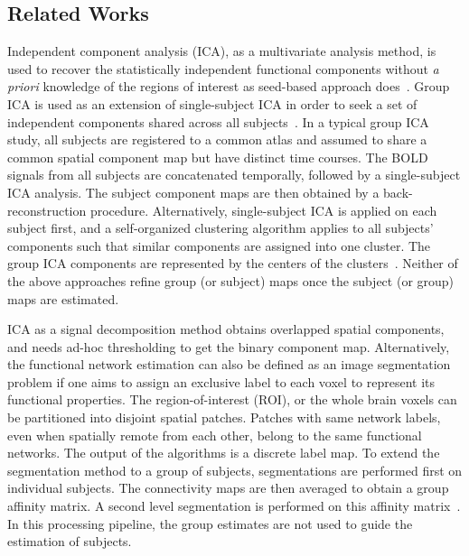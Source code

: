 \documentclass[review,authoryear]{elsarticle}
\begin{document}
\subsection{Related Works}
\label{sec:ref}
Independent component analysis (ICA), as a multivariate analysis method, is used
to recover the statistically independent functional components without \emph{a
  priori} knowledge of the regions of interest as seed-based approach
does~\citep{hyvarinen2000independent}. Group ICA is used as an extension of
single-subject ICA in order to seek a set of independent components shared
across all subjects~\citep{calhoun2001spatial, beckmann2009group}. In a typical
group ICA study, all subjects are registered to a common atlas and assumed to
share a common spatial component map but have distinct time courses. The BOLD
signals from all subjects are concatenated temporally, followed by a
single-subject ICA analysis. The subject component maps are then obtained by a
back-reconstruction procedure. Alternatively, single-subject ICA is applied on
each subject first, and a self-organized clustering algorithm applies to all
subjects' components such that similar components are assigned into one
cluster. The group ICA components are represented by the centers of the
clusters~\citep{esposito2005independent}. Neither of the above approaches refine
group (or subject) maps once the subject (or group) maps are estimated.

ICA as a signal decomposition method obtains overlapped spatial components, and
needs ad-hoc thresholding to get the binary component map. Alternatively, the
functional network estimation can also be defined as an image segmentation
problem if one aims to assign an exclusive label to each voxel to represent its
functional properties. The region-of-interest (ROI), or the whole brain voxels
can be partitioned into disjoint spatial patches. Patches with same network
labels, even when spatially remote from each other, belong to the same
functional networks. The output of the algorithms is a discrete label map. To
extend the segmentation method to a group of subjects, segmentations are
performed first on individual subjects. The connectivity maps are then averaged
to obtain a group affinity matrix. A second level segmentation is performed on
this affinity matrix~\citep{bellec2010multi, van2008normalized}. In this
processing pipeline, the group estimates are not used to guide the estimation of
subjects.
\end{document}

